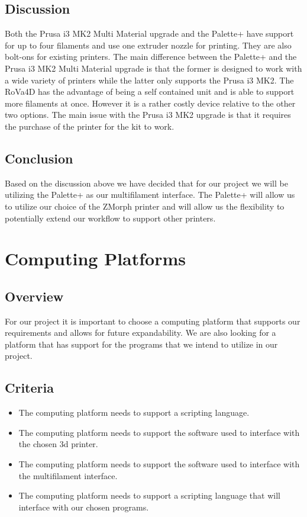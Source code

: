 \documentclass[letterpaper, onecolumn, draftclsnofoot, 10pt, compsoc]{IEEEtran}
\begin{document}
\subsection{Discussion}
	\begin{singlespacing}
	Both the Prusa i3 MK2 Multi Material upgrade and the Palette+ have support for up to four filaments and use one extruder nozzle for printing. They are also bolt-ons for existing printers. The main difference between the Palette+ and the Prusa i3 MK2 Multi Material upgrade is that the former is designed to work with a wide variety of printers while the latter only supports the Prusa i3 MK2. The RoVa4D has the advantage of being a self contained unit and is able to support more filaments at once. However it is a rather costly device relative to the other two options. The main issue with the Prusa i3 MK2 upgrade is that it requires the purchase of the printer for the kit to work.
	\end{singlespacing}
\subsection{Conclusion}
	\begin{singlespacing}
	Based on the discussion above we have decided that for our project we will be utilizing the Palette+ as our multifilament interface. The Palette+ will allow us to utilize our choice of the ZMorph printer and will allow us the flexibility to potentially extend our workflow to support other printers.
	\end{singlespacing}

\section{Computing Platforms}
\subsection{Overview}
	\begin{singlespace}
	For our project it is important to choose a computing platform that supports our requirements and allows for future expandability. We are also looking for a platform that has support for the programs that we intend to utilize in our project. 
	\end{singlespace}
\subsection{Criteria}
	\begin{singlespace}
		\begin{itemize}
		\item The computing platform needs to support a scripting language.
        \item The computing platform needs to support the software used to interface with the chosen 3d printer.
        \item The computing platform needs to support the software used to interface with the multifilament interface.
        \item The computing platform needs to support a scripting language that will interface with our chosen programs.
		\end{itemize}
	\end{singlespace}
\end{document}
